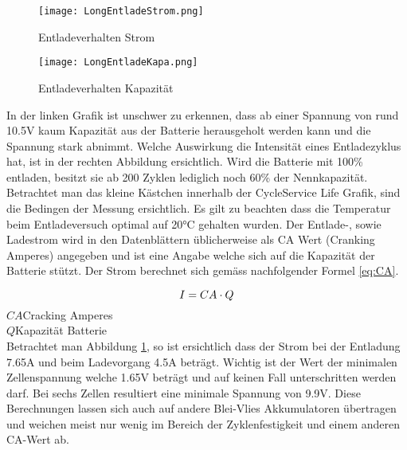 \begin{figure}[H]
	\centering
	\begin{minipage}[h]{.48\linewidth} %
		\centering
		\texttt{[image: LongEntladeStrom.png]}
		\caption[Batterie Entladeverhalten Strom]{Entladeverhalten Strom}
		\label{fig:EntladeStrom}
	\end{minipage}
	\quad %
	\begin{minipage}[h]{.48\linewidth} %
		\centering
		\texttt{[image: LongEntladeKapa.png]}
		\caption[Batterie Entladeverhalten Kapazität]{Entladeverhalten Kapazität}
		\label{fig:EntladeKapazität}
	\end{minipage}
\end{figure}

In der linken Grafik ist unschwer zu erkennen, dass ab einer Spannung von rund 10.5V kaum Kapazität aus der Batterie herausgeholt werden kann und die Spannung stark abnimmt. Welche Auswirkung die Intensität eines Entladezyklus hat, ist in der rechten Abbildung ersichtlich. Wird die Batterie mit 100\% entladen, besitzt sie ab 200 Zyklen lediglich noch 60\% der Nennkapazität. Betrachtet man das kleine Kästchen innerhalb der \glqq Cycle\grqq Service Life Grafik, sind die Bedingen der Messung ersichtlich. Es gilt zu beachten dass die Temperatur beim Entladeversuch optimal auf 20°C gehalten wurden. Der Entlade-, sowie Ladestrom wird in den Datenblättern üblicherweise als CA Wert (Cranking Amperes) angegeben und ist eine Angabe welche sich auf die Kapazität der Batterie stützt. Der Strom berechnet sich gemäss nachfolgender Formel \ref{eq:CA}.

\begin{equation}
\centering
I=CA \cdot Q
\label{eq:CA}
\end{equation}
$ CA $\quad 	Cracking Amperes      \\
$ Q $\qquad  Kapazität Batterie     \\

Betrachtet man Abbildung \ref{fig:EntladeKapazität}, so ist ersichtlich dass der Strom bei der Entladung 7.65A und beim Ladevorgang 4.5A beträgt.
Wichtig ist der Wert der minimalen Zellenspannung welche 1.65V beträgt und auf keinen Fall unterschritten werden darf. Bei sechs Zellen resultiert eine minimale Spannung von 9.9V. Diese Berechnungen lassen sich auch auf andere Blei-Vlies Akkumulatoren übertragen und weichen meist nur wenig im Bereich der Zyklenfestigkeit und einem anderen CA-Wert ab.